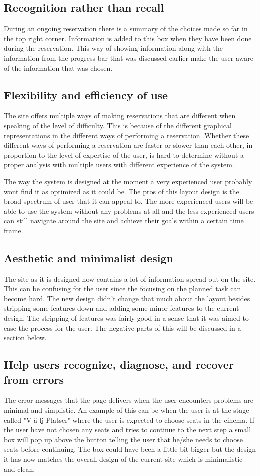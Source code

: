 \documentclass[a4paper,11pt]{article}
\begin{document}
\subsection{Recognition rather than recall}
During an ongoing reservation there is a summary of the choices made so far in the top right corner. Information is added to this box when they have been done during the reservation. This way of showing information along with the information from the progress-bar that was discussed earlier make the user aware of the information that was chosen. 


\subsection{Flexibility and efficiency of use}
The site offers multiple ways of making reservations that are different when speaking of the level of difficulty. This is because of the different graphical representations in the different ways of performing a reservation. Whether these different ways of performing a reservation are faster or slower than each other, in proportion to the level of expertise of the user, is hard to determine without a proper analysis with multiple users with different experience of the system.

The way the system is designed at the moment a very experienced user probably wont find it as optimized as it could be. The pros of this layout design is the broad spectrum of user that it can appeal to. The more experienced users will be able to use the system without any problems at all and the less experienced users can still navigate around the site and achieve their goals within a certain time frame.   

\subsection{Aesthetic and minimalist design}
The site as it is designed now contains a lot of information spread out on the site. This can be confusing for the user since the focusing on the planned task can become hard. The new design didn’t change that much about the layout besides stripping some features down and adding some minor features to the current design. The stripping of features was fairly good in a sense that it was aimed to ease the process for the user. The negative parts of this will be discussed in a section below. 

\subsection{Help users recognize, diagnose, and recover from errors}
The error messages that the page delivers when the user encounters problems are minimal and simplistic. An example of this can be when the user is at the stage called "V \"a lj Platser" where the user is expected to choose seats in the cinema. If the user have not chosen any seats and tries to continue to the next step a small box will pop up above the button telling the user that he/she needs to choose seats before continuing. The box could have been a little bit bigger but the design it has now matches the overall design of the current site which is minimalistic and clean. 
\end{document}
